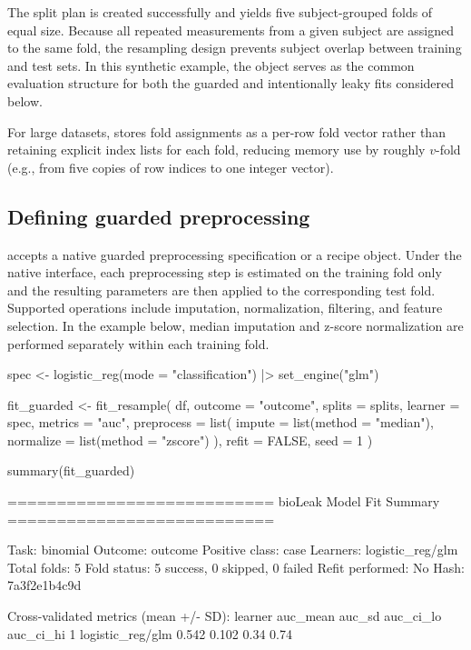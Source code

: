 \documentclass[article,shortnames]{jss}
\begin{document}
\noindent
The split plan is created successfully and yields five subject-grouped folds of equal size. Because all repeated measurements from a given subject are assigned to the same fold, the resampling design prevents subject overlap between training and test sets. In this synthetic example, the object serves as the common evaluation structure for both the guarded and intentionally leaky fits considered below.

For large datasets,  stores fold assignments as a per-row fold vector rather than retaining explicit index lists for each fold, reducing memory use by roughly $v$-fold (e.g., from five copies of row indices to one integer vector).

\subsection{Defining guarded preprocessing}

 accepts a native guarded preprocessing specification
or a  recipe object. Under the native interface, each
preprocessing step is estimated on the training fold only and the resulting
parameters are then applied to the corresponding test fold. Supported
operations include imputation, normalization, filtering, and feature
selection. In the example below, median imputation and z-score normalization
are performed separately within each training fold.

\begin{CodeInput}
spec <- logistic_reg(mode = "classification") |>
  set_engine("glm")

fit_guarded <- fit_resample(
  df,
  outcome = "outcome",
  splits = splits,
  learner = spec,
  metrics = "auc",
  preprocess = list(
    impute = list(method = "median"),
    normalize = list(method = "zscore")
  ),
  refit = FALSE,
  seed = 1
)

summary(fit_guarded)
\end{CodeInput}
\begin{CodeOutput}
===========================
 bioLeak Model Fit Summary
===========================

Task: binomial
Outcome: outcome
Positive class: case
Learners: logistic_reg/glm
Total folds: 5
Fold status: 5 success, 0 skipped, 0 failed
Refit performed: No
Hash: 7a3f2e1b4c9d

Cross-validated metrics (mean +/- SD):
           learner auc_mean auc_sd auc_ci_lo auc_ci_hi
1 logistic_reg/glm    0.542  0.102      0.34      0.74
\end{CodeOutput}
\end{document}
